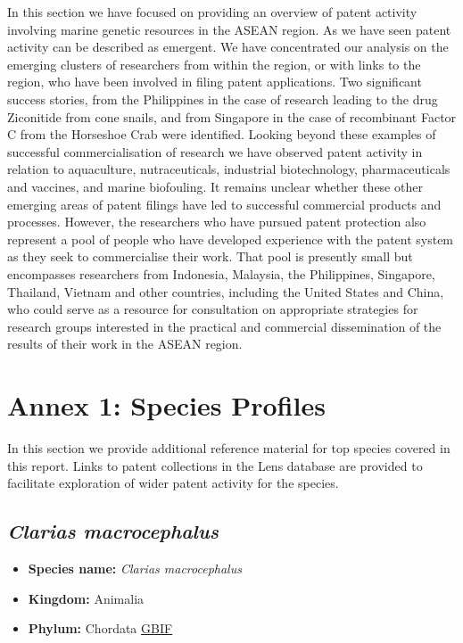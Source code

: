 \documentclass[]{book}
\providecommand{\tightlist}{%
  \setlength{\itemsep}{0pt}\setlength{\parskip}{0pt}}
\theoremstyle{definition}
\theoremstyle{definition}
\theoremstyle{definition}
\theoremstyle{remark}
\begin{document}
In this section we have focused on providing an overview of patent
activity involving marine genetic resources in the ASEAN region. As we
have seen patent activity can be described as emergent. We have
concentrated our analysis on the emerging clusters of researchers from
within the region, or with links to the region, who have been involved
in filing patent applications. Two significant success stories, from the
Philippines in the case of research leading to the drug Ziconitide from
cone snails, and from Singapore in the case of recombinant Factor C from
the Horseshoe Crab were identified. Looking beyond these examples of
successful commercialisation of research we have observed patent
activity in relation to aquaculture, nutraceuticals, industrial
biotechnology, pharmaceuticals and vaccines, and marine biofouling. It
remains unclear whether these other emerging areas of patent filings
have led to successful commercial products and processes. However, the
researchers who have pursued patent protection also represent a pool of
people who have developed experience with the patent system as they seek
to commercialise their work. That pool is presently small but
encompasses researchers from Indonesia, Malaysia, the Philippines,
Singapore, Thailand, Vietnam and other countries, including the United
States and China, who could serve as a resource for consultation on
appropriate strategies for research groups interested in the practical
and commercial dissemination of the results of their work in the ASEAN
region.

\hypertarget{species}{%
\chapter{Annex 1: Species Profiles}\label{species}}

In this section we provide additional reference material for top species
covered in this report. Links to patent collections in the Lens database
are provided to facilitate exploration of wider patent activity for the
species.

\hypertarget{clarias-macrocephalus}{%
\section{\texorpdfstring{\emph{Clarias
macrocephalus}}{Clarias macrocephalus}}\label{clarias-macrocephalus}}

\begin{itemize}
\tightlist
\item
  \textbf{Species name:} \emph{Clarias macrocephalus}
\item
  \textbf{Kingdom:} Animalia\\
\item
  \textbf{Phylum:} Chordata
  \href{https://www.gbif.org/species/5202728}{GBIF}
\end{itemize}
\end{document}
